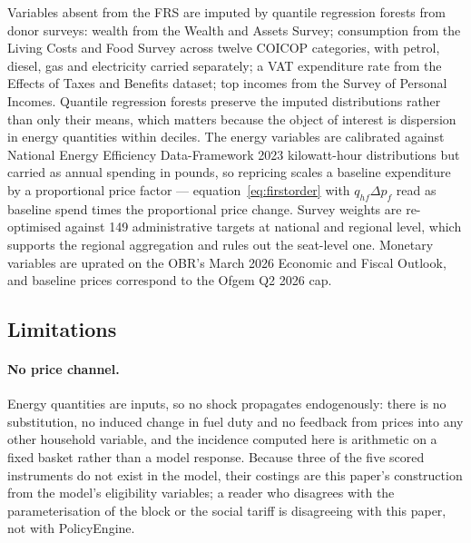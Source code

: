Variables absent from the FRS are imputed by quantile regression forests from donor surveys: wealth from the Wealth and Assets Survey; consumption from the Living Costs and Food Survey across twelve COICOP categories, with petrol, diesel, gas and electricity carried separately; a VAT expenditure rate from the Effects of Taxes and Benefits dataset; top incomes from the Survey of Personal Incomes. Quantile regression forests preserve the imputed distributions rather than only their means, which matters because the object of interest is dispersion in energy quantities within deciles. The energy variables are calibrated against National Energy Efficiency Data-Framework 2023 kilowatt-hour distributions but carried as annual spending in pounds, so repricing scales a baseline expenditure by a proportional price factor --- equation~\eqref{eq:firstorder} with $q_{hf}\Delta p_f$ read as baseline spend times the proportional price change. Survey weights are re-optimised against 149 administrative targets at national and regional level, which supports the regional aggregation and rules out the seat-level one. Monetary variables are uprated on the OBR's March 2026 Economic and Fiscal Outlook, and baseline prices correspond to the Ofgem Q2 2026 cap.

\subsection{Limitations}
\label{sec:limitations}

\paragraph{No price channel.} Energy quantities are inputs, so no shock propagates endogenously: there is no substitution, no induced change in fuel duty and no feedback from prices into any other household variable, and the incidence computed here is arithmetic on a fixed basket rather than a model response. Because three of the five scored instruments do not exist in the model, their costings are this paper's construction from the model's eligibility variables; a reader who disagrees with the parameterisation of the block or the social tariff is disagreeing with this paper, not with PolicyEngine.

